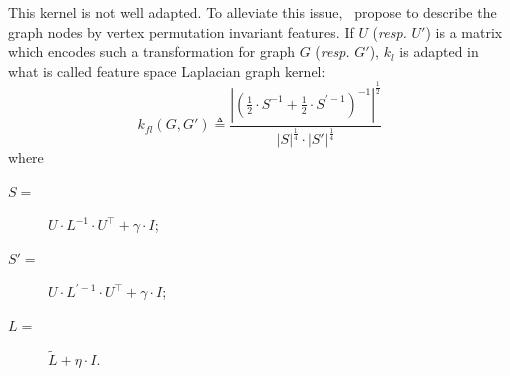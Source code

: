                 This kernel is not well adapted.
                To alleviate this issue,~\textcite{kondor2016multiscale} propose to describe the graph nodes by vertex permutation invariant features.
                If $U$ (\textit{resp.} $U'$) is a matrix which encodes such a transformation for graph $G$ (\textit{resp.} $G'$), $k_{l}$ is adapted in what is called feature space Laplacian graph kernel:
                \begin{equation}
                    \label{eq::feature_laplacian_kernel}
                    k_{fl}(G, G') \triangleq \frac{\left\lvert \left(\frac{1}{2} \cdot S^{-1} + \frac{1}{2} \cdot S^{\prime -1} \right)^{-1} \right\rvert^{\frac{1}{2}}}{\left\lvert S\right\rvert^{\frac{1}{4}}\cdot\left\lvert S' \right\rvert^{\frac{1}{4}}}
                \end{equation}
                where 
                \begin{description}
                    \item[\(S =\)] \(U\cdot L^{-1}\cdot U^\intercal + \gamma \cdot I\);
                    \item[\(S' =\)] \(U\cdot L^{\prime -1}\cdot U^\intercal + \gamma \cdot I\);
                    \item[\(L = \)] \(\widetilde{L} + \eta \cdot I\).
                \end{description}

